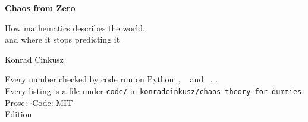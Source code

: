 \thispagestyle{empty}
\begin{center}
\vspace*{3.0cm}

{\Huge\bfseries\color{mblue} Chaos from Zero}

\vspace{1.0cm}
{\Large\color{mgrey} How mathematics describes the world,\\[4pt]
and where it stops predicting it}

\vspace{2.4cm}
{\large Konrad Cinkusz}

\vfill
{\small\color{mgrey}
Every number checked by code run on Python~\pypatch, ~\numpyver{}
and ~\matplotlibver, \pinnedon.\\[4pt]
Every listing is a file under \texttt{code/} in
\texttt{konradcinkusz/chaos-theory-for-dummies}.\\[10pt]
Prose: \proselicence{} \quad$\cdot$\quad Code: MIT\\[4pt]
Edition \bookedition}

\vspace{1.2cm}
\end{center}
\clearpage
